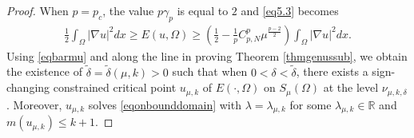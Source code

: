 \documentclass[10pt,a4paper]{article}
\theoremstyle{definition} \theoremstyle{remark}
\numberwithin{equation}{section}
\newcommand{\R}{\mathbb{R}}
\newcommand{\B}{\mathcal{B}}
\newcommand{\la}{\lambda}
\newcommand{\ga}{\gamma}
\newcommand{\ep}{\epsilon}
\begin{document}
\begin{proof}

	When $p = p_c$, the value $p\ga_p$ is equal to $2$ and \eqref{eq5.3} becomes
	\begin{align} \label{eq5.3two}
		\frac12 \int_\Omega |\nabla u|^2dx \ge E(u,\Omega) \geq \left( \frac12 - \frac1p C_{p,N}^p \mu^{\frac{p-2}{2}}\right)  \int_\Omega |\nabla u|^2dx.
	\end{align}
    Using \eqref{eqbarmu} and along the line in proving Theorem \ref{thmgenussub}, we obtain the existence of $\tilde \delta = \tilde \delta(\mu,k) > 0$ such that when $0 < \delta < \tilde \delta$, there exists a sign-changing constrained critical point $u_{\mu,k}$ of $E(\cdot,\Omega)$ on $S_\mu(\Omega)$ at the level $\nu_{\mu,k,\delta}$. Moreover, $u_{\mu,k}$ solves \eqref{eqonbounddomain} with $\la = \la_{\mu,k}$ for some $\la_{\mu,k} \in \R$ and $m(u_{\mu,k}) \le k+1$.


\end{proof}
\end{document}
